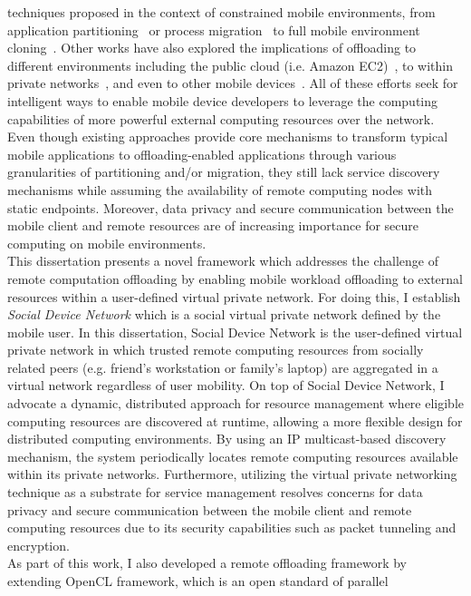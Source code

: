 techniques proposed in the context of constrained mobile environments,
from application partitioning~\cite{maui} or process
migration~\cite{hung} to full mobile environment
cloning~\cite{clonecloud}.
%
Other works have also explored the implications of offloading to
different environments including the public cloud (i.e. Amazon
EC2)~\cite{hung}, to within private networks~\cite{shigeru}, and even to
other mobile devices~\cite{serendipity}.
%
All of these efforts seek for intelligent ways to enable mobile device
developers to leverage the computing capabilities of more powerful
external computing resources over the network.
%
Even though existing approaches provide core mechanisms to transform
typical mobile applications to offloading-enabled applications through
various granularities of partitioning and/or migration, they still lack
service discovery mechanisms while assuming the availability of remote
computing nodes with static endpoints.
%
Moreover, data privacy and secure communication between the mobile
client and remote resources are of increasing importance for secure
computing on mobile environments.\\
%
This dissertation presents a novel framework which addresses the challenge
of remote computation offloading by enabling mobile workload offloading
to external resources within a user-defined virtual private network.
%
For doing this, I establish \textit{Social Device Network} which is a social
virtual private network defined by the mobile user.
%
In this dissertation, Social Device Network is the user-defined virtual
private network in which trusted remote computing resources from
socially related peers (e.g. friend's workstation or family's laptop)
are aggregated in a virtual network regardless of user mobility.
%
On top of Social Device Network, I advocate a dynamic, distributed
approach for resource management where eligible computing resources are
discovered at runtime, allowing a more flexible design for distributed
computing environments.
%
By using an IP multicast-based discovery mechanism, the system
periodically locates remote computing resources available within its
private networks.
%
Furthermore, utilizing the virtual private networking technique as a
substrate for service management resolves concerns for data privacy and
secure communication between the mobile client and remote computing
resources due to its security capabilities such as packet tunneling and
encryption.\\
%
As part of this work, I also developed a remote offloading framework by
extending OpenCL framework, which is an open standard of parallel
